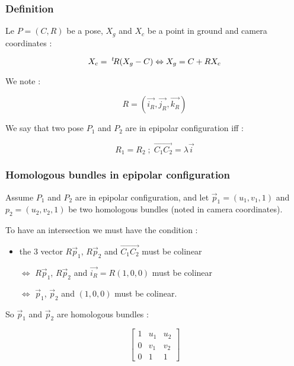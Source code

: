 \subsubsection{Definition}
Le $P=(C,R)$ be a pose, $X_g$ and $X_c$ be a point in ground and camera coordinates :

\begin{equation}
	X_c = \; ^{t} \! R (X_g-C) \Leftrightarrow  X_g = C+   R X_c
\end{equation}

We note :

\begin{equation}
	R= (\vec{i_R},\vec{j_R},\vec{k_R})
\end{equation}

We say that two pose $P_1$ and $P_2$ are in epipolar configuration iff :


\begin{equation}
	R_1 = R_2 \;  ; \;  \overrightarrow{C_1 C_2} = \lambda \vec{i}
\end{equation}


\subsubsection{Homologous bundles in epipolar configuration}

Assume $P_1$ and $P_2$ are in epipolar configuration, and
let $\vec{p}_1=(u_1,v_1,1) $ and ${p}_2=(u_2,v_2,1) $  be two homologous bundles
(noted in camera coordinates). 

To have an intersection we must have the condition :

\begin{itemize}
   \item the $3$ vector $R\vec{p}_1$, $R \vec{p}_2$ and $ \overrightarrow{C_1 C_2}$ must be colinear
   \item[$\Leftrightarrow$]  $R\vec{p}_1$, $R \vec{p}_2$ and $ \vec{i_R} = R(1,0,0)$ must be colinear
   \item[$\Leftrightarrow$]   $\vec{p}_1$, $\vec{p}_2$ and $ (1,0,0)$ must be colinear.
\end{itemize}

So $\vec{p}_1$ and  $\vec{p}_2$ are homologous bundles :

\begin{equation}
	 \begin{bmatrix} 1 & u_1 & u_2 \\ 0 & v_1 & v_2 \\ 0 & 1 & 1 \end{bmatrix} 
\end{equation}


